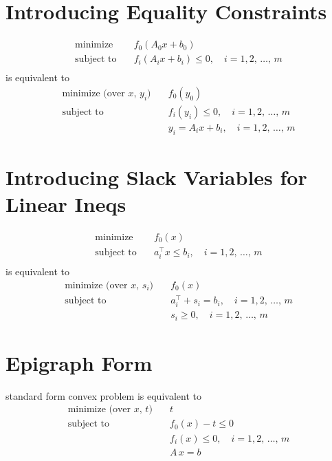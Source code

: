 \documentclass[11pt]{extarticle}
\theoremstyle{definition}
\begin{document}
\section*{Introducing Equality Constraints}
\begin{align*}
  \text{minimize}\quad &f_0(A_0 x + b_0) \\
  \text{subject to}\quad &f_i(A_i x + b_i)\leqslant 0, \quad i = 1, 2,\,\ldots,\,m \\
\end{align*} 
is equivalent to 
\begin{align*}
  \text{minimize (over $x$, $y_i$)}\quad &f_0(y_0) \\
  \text{subject to}\quad &f_i(y_i)\leqslant 0, \quad i = 1, 2,\,\ldots,\,m \\
  \qquad\qquad & y_i = A_i x + b_i, \quad i = 1, 2,\,\ldots,\,m 
\end{align*} 

\section*{Introducing Slack Variables for Linear Ineqs}
\begin{align*}
  \text{minimize}\quad &f_0(x) \\
  \text{subject to}\quad &a_i^\top x\leqslant b_i, \quad i = 1, 2,\,\ldots,\,m \\
\end{align*} 
is equivalent to 
\begin{align*}
  \text{minimize (over $x$, $s_i$)}\quad &f_0(x) \\
  \text{subject to}\quad &a_i^\top + s_i = b_i, \quad i = 1, 2,\,\ldots,\,m \\
  \qquad\qquad & s_i\geqslant 0, \quad i = 1, 2,\,\ldots,\,m 
\end{align*} 

\section*{Epigraph Form}
standard form convex problem is equivalent to 
\begin{align*}
  \text{minimize (over $x$, $t$)}\quad &t \\
  \text{subject to}\quad &f_0(x) - t \leqslant 0\\
  \qquad\qquad & f_i(x)\leqslant 0, \quad i = 1, 2,\,\ldots,\,m \\
  \qquad\qquad & A\,x = b 
\end{align*} 
\end{document}
